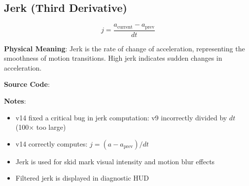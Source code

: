 \subsection{Jerk (Third Derivative)}

\begin{equation}
  j = \frac{a_{\text{current}} - a_{\text{prev}}}{dt}
  \label{eq:jerk}
\end{equation}

\textbf{Physical Meaning}: Jerk is the rate of change of acceleration, representing the smoothness of motion transitions. High jerk indicates sudden changes in acceleration.

\textbf{Source Code}: 

\textbf{Notes}:
\begin{itemize}
  \item v14 fixed a critical bug in jerk computation: v9 incorrectly divided by $dt$ (100× too large)
  \item v14 correctly computes: $j = (a - a_{\text{prev}}) / dt$
  \item Jerk is used for skid mark visual intensity and motion blur effects
  \item Filtered jerk is displayed in diagnostic HUD
\end{itemize}

\newpage

